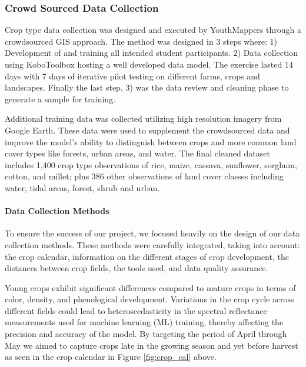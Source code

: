 \documentclass[
  journal,
  twocolumn]{IEEEtran}
\begin{document}
\hypertarget{crowd-sourced-data-collection}{%
\subsubsection{Crowd Sourced Data
Collection}\label{crowd-sourced-data-collection}}

Crop type data collection was designed and executed by YouthMappers
through a crowdsourced GIS approach. The method was designed in 3 steps
where: 1) Development of and training all intended student participants.
2) Data collection using KoboToolbox hosting a well developed data
model. The exercise lasted 14 days with 7 days of iterative pilot
testing on different farms, crops and landscapes. Finally the last step,
3) was the data review and cleaning phase to generate a sample for
training.

Additional training data was collected utilizing high resolution imagery
from Google Earth. These data were used to supplement the crowdsourced
data and improve the model's ability to distinguish between crops and
more common land cover types like forests, urban areas, and water. The
final cleaned dataset includes 1,400 crop type observations of rice,
maize, cassava, sunflower, sorghum, cotton, and millet; plus 386 other
observations of land cover classes including water, tidal areas, forest,
shrub and urban.

\hypertarget{data-collection-methods}{%
\paragraph{Data Collection Methods}\label{data-collection-methods}}

To ensure the success of our project, we focused heavily on the design
of our data collection methods. These methods were carefully integrated,
taking into account: the crop calendar, information on the different
stages of crop development, the distances between crop fields, the tools
used, and data quality assurance.

Young crops exhibit significant differences compared to mature crops in
terms of color, density, and phenological development. Variations in the
crop cycle across different fields could lead to heteroscedasticity in
the spectral reflectance measurements used for machine learning (ML)
training, thereby affecting the precision and accuracy of the model. By
targeting the period of April through May we aimed to capture crops late
in the growing season and yet before harvest as seen in the crop
calendar in Figure \ref{fig:crop_cal} above.
\end{document}
